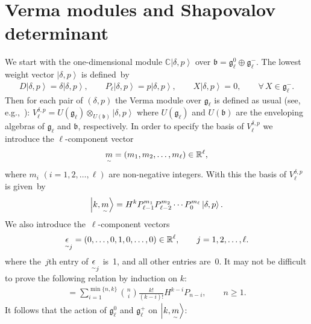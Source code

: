 \documentclass[11pt]{article}
\numberwithin{equation}{section}
\newcommand{\underaccent}[2]{\mathord{\underset{\smash{\scriptscriptstyle\sim}}{#2}}}
\def\ket#1{\left| #1\right\rangle}
\begin{document}
\section{Verma modules and Shapovalov determinant}
\label{SEC:VM}

We start with the one-dimensional module $ {\mathbb C} \ket{\delta,p} $ over $ {\mathfrak b} = {\mathfrak g}_{\ell}^0
\oplus {\mathfrak g}_{\ell}^-$. The lowest weight vector $ \ket{\delta,p} $ is def\/ined~by
\begin{gather*}
D \ket{\delta,p} = \delta \ket{\delta,p},
\qquad
P_{\ell} \ket{\delta,p} = p \ket{\delta,p},
\qquad
X \ket{\delta,p} = 0,
\qquad
 \forall \, X \in {\mathfrak g}_{\ell}^-.
\end{gather*}
Then for each pair of $(\delta,p) $ the Verma module over $ {\mathfrak g}_{\ell} $ is def\/ined as usual (see, e.g.,~\cite{Dix}): $ V^{\delta,p}_{\ell} = U({\mathfrak g}_{\ell}) \otimes_{U({\mathfrak b})} \ket{\delta,p} $ where $U({\mathfrak g}_{\ell})$ and $ U({\mathfrak b}) $ are the enveloping algebras of $ {\mathfrak g}_{\ell} $ and $
\mathfrak b$, respectively.
In order to specify the basis of $ V^{\delta,p}_{\ell} $ we introduce the $ \ell$-component vector
\begin{gather*}
\underaccent{\tilde}{m} = (m_1, m_2, \dots, m_{\ell})  \in {\mathbb R}^{\ell},
\end{gather*}
where $ m_i$ $(i=1,2,\dots,\ell) $ are non-negative integers.
With this the basis of $ V^{\delta,p}_{\ell} $ is given~by
\begin{gather}
\ket{k,\underaccent{\tilde}{m}} = H^k P_{\ell-1}^{m_1} P_{\ell-2}^{m_2} \cdots P_0^{m_{\ell}} \ket{\delta,p}.
\label{anyl-basis}
\end{gather}
We also introduce the~$\ell$-component vectors
\begin{gather*}
\underaccent{\tilde}{\epsilon}_j = (0, \dots, 0, 1, 0, \dots,0) \in {\mathbb R}^{\ell},
\qquad
j=1,2,\dots, \ell.
\end{gather*}
where the~$j$th entry of $\underaccent{\tilde}{\epsilon}_j $ is~1, and all other entries are~0.
It may not be dif\/f\/icult to prove the following relation by induction on $k$:
\begin{gather}
[P_n, H^k] = \sum\limits_{i=1}^{\min\{n,k\}} \binom{n}{i} \frac{k!}{(k-i)!}  H^{k-i}   P_{n-i},
\qquad
n \geq 1.
\label{PnHkcomm}
\end{gather}
It follows that the action of $ {\mathfrak g}_{\ell}^0$ and ${\mathfrak g}_{\ell}^+$ on $\ket{k,\underaccent{\tilde}{m}}$:
\end{document}
